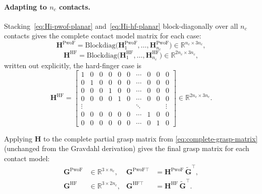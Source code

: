 \paragraph{Adapting to $n_c$ contacts.}
Stacking~\eqref{eq:Hi-pwof-planar} and~\eqref{eq:Hi-hf-planar} block-diagonally
over all $n_c$ contacts gives the complete contact model matrix for each
case:
\begin{equation}
    \boldsymbol{H}^{\mathrm{PwoF}} = \mathrm{Blockdiag}\big(\boldsymbol{H}_1^{\mathrm{PwoF}}, \ldots, \boldsymbol{H}_{n_c}^{\mathrm{PwoF}}\big) \in \mathbb{R}^{n_c \times 3n_c} ,
    \label{eq:H-pwof-nc}
\end{equation}
\begin{equation}
    \boldsymbol{H}^{\mathrm{HF}} = \mathrm{Blockdiag}\big(\boldsymbol{H}_1^{\mathrm{HF}}, \ldots, \boldsymbol{H}_{n_c}^{\mathrm{HF}}\big) \in \mathbb{R}^{2n_c \times 3n_c} ,
    \label{eq:H-hf-nc}
\end{equation}
written out explicitly, the hard-finger case is
\begin{equation}
    \boldsymbol{H}^{\mathrm{HF}} =
    \left[\begin{array}{ccc|ccc|c|ccc}
        1 & 0 & 0 & 0 & 0 & 0 & \cdots & 0 & 0 & 0 \\
        0 & 1 & 0 & 0 & 0 & 0 & \cdots & 0 & 0 & 0 \\
        0 & 0 & 0 & 1 & 0 & 0 & \cdots & 0 & 0 & 0 \\
        0 & 0 & 0 & 0 & 1 & 0 & \cdots & 0 & 0 & 0 \\
        \vdots & & & & & & \ddots & & & \vdots \\
        0 & 0 & 0 & 0 & 0 & 0 & \cdots & 1 & 0 & 0 \\
        0 & 0 & 0 & 0 & 0 & 0 & \cdots & 0 & 1 & 0
    \end{array}\right] \in \mathbb{R}^{2n_c \times 3n_c} .
    \label{eq:H-hf-nc-explicit}
\end{equation}

Applying $\boldsymbol{H}$ to the complete partial grasp matrix from
\eqref{eq:complete-grasp-matrix} (unchanged from the Gravdahl derivation)
gives the final grasp matrix for each contact model:
\begin{align}
    \boldsymbol{G}^{\mathrm{PwoF}} &\in \mathbb{R}^{3 \times n_c} , &
    \boldsymbol{G}^{\mathrm{PwoF}\top} &= \boldsymbol{H}^{\mathrm{PwoF}}\,\tilde{\boldsymbol{G}}^\top ,
    \label{eq:G-pwof-nc}\\
    \boldsymbol{G}^{\mathrm{HF}} &\in \mathbb{R}^{3 \times 2n_c} , &
    \boldsymbol{G}^{\mathrm{HF}\top} &= \boldsymbol{H}^{\mathrm{HF}}\,\tilde{\boldsymbol{G}}^\top .
    \label{eq:G-hf-nc}
\end{align}

